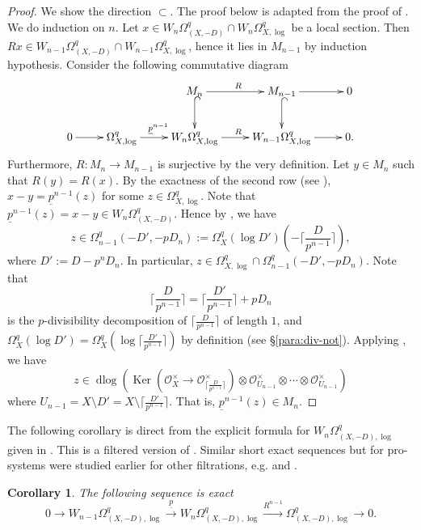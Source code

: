 \documentclass[11pt]{amsart}
\newcommand{\ra}{\rightarrow}
\newcommand{\cO}{\mathcal{O}}
\newcommand{\Ker}{\operatorname{Ker}}
\newcommand{\xra}{\xrightarrow}
\newcommand{\dlog}{\operatorname{dlog}}
\newcommand{\ul}{\underline}
\theoremstyle{plain}
\newtheorem{cor}[prop]{Corollary}
\newtheorem{claim}{Claim}[prop]
\theoremstyle{definition}
\numberwithin{equation}{prop}
\begin{document}
\begin{proof}
We show the direction $\subset$.
The proof below is adapted from the proof of \cite[Theorem 2.3.1]{JSZ}.
We do induction on $n$.
Let $x\in W_n\Omega^q_{(X,-D)}\cap W_n\Omega^q_{X,\log}$ be a local section. 
Then $Rx\in W_{n-1}\Omega^q_{(X,-D)}\cap W_{n-1}\Omega^q_{X,\log}$, hence it lies in $M_{n-1}$ by induction hypothesis.
Consider the following commutative diagram
$$\xymatrix{
&&
M_n
\ar[r]^R\ar@{^(->}[d]&
M_{n-1}
\ar[r]\ar@{^(->}[d]&
0
\\
0\ar[r]&
\Omega^q_{X,\log}
\ar[r]^{\ul p^{n-1}}&
W_n\Omega^q_{X,\log}
\ar[r]^{R}&
W_{n-1}\Omega^q_{X,\log}
\ar[r]&
0.
}$$
Furthermore, 
$R:M_n\ra M_{n-1}$ is surjective by the very definition.
Let $y\in M_n$ such that $R(y)=R(x)$.
By the exactness of the second row (see \cite[Lemme 3]{CTSS}),
$x-y=\ul p^{n-1}(z)$ for some $z\in \Omega^q_{X,\log}$.
Note that $\ul p^{n-1}(z)=x-y\in W_n\Omega^q_{(X,-D)}$.
Hence by \cite[Lemma 8.11]{RamFil1}, we have 
$$z\in \Omega^q_{n-1}(-D',-pD_n):=\Omega^q_X(\log D')(-\lceil\frac{D}{p^{n-1}}\rceil),$$
where $D':=D-p^nD_n.$
In particular, $z\in \Omega^q_{X,\log}\cap \Omega^q_{n-1}(-D',-pD_n)$.
Note that
$$\lceil\frac{D}{p^{n-1}}\rceil= \lceil\frac{D'}{p^{n-1}}\rceil+pD_n
$$
is the $p$-divisibility decomposition of $\lceil\frac{D}{p^{n-1}}\rceil$ of length $1$, and $\Omega^q_X(\log D')=\Omega^q_X(\log \lceil\frac{D'}{p^{n-1}}\rceil)$ by definition (see \S\ref{para:div-not}).
Applying , we have
$$z\in \dlog \left(
\Ker(\cO_X^\times\ra \cO_{\lceil\frac{D}{p^{n-1}}\rceil}^ \times)
\otimes \cO_{U_{n-1}}^\times \otimes\cdots \otimes \cO_{U_{n-1}}^\times
\right)$$
where $U_{n-1}=X\setminus D'=X\setminus\lceil\frac{D'}{p^{n-1}}\rceil$.
That is, $\ul p^{n-1}(z)\in M_n$.
\end{proof}

The following corollary is direct from the explicit formula for $W_n\Omega^q_{(X,-D),\log}$ given in .
This is a filtered version of \cite[Lemme 3]{CTSS}.
Similar short exact sequences but for pro-systems were studied earlier for other filtrations, e.g. \cite[Proposition 5.9]{Gupta-Krishna} and \cite[Theorem 4.6]{Morrow}.
\begin{cor}
\label{Cor1}
The following sequence is exact
$$0\ra 
W_{n-1}\Omega^q_{(X,-D),\log}
\xra{\ul p}
W_n\Omega^q_{(X,-D),\log}
\xra{R^{n-1}}
\Omega^q_{(X,-D),\log}
\ra 0.
$$
\end{cor}
\end{document}
